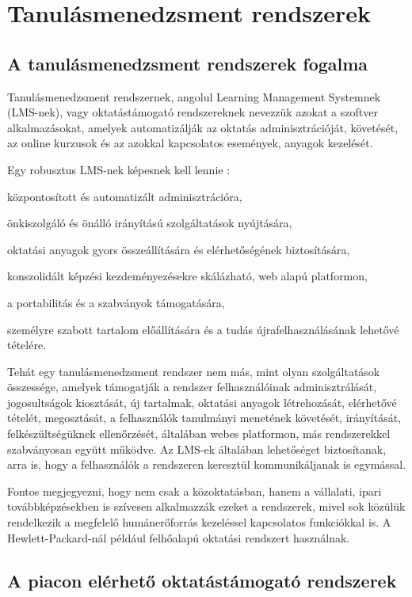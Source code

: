 \chapter{Tanulásmenedzsment rendszerek}
\section{A tanulásmenedzsment rendszerek fogalma}
Tanulásmenedzsment rendszernek, angolul Learning Management Systemnek (LMS-nek), vagy oktatástámogató rendszereknek nevezzük azokat a szoftver alkalmazásokat, amelyek automatizálják az oktatás adminisztrációját, követését, az online kurzusok és az azokkal kapcsolatos események, anyagok kezelését.

Egy robusztus LMS-nek képesnek kell lennie \cite{ellis2009}:
\begin{sajat_itemize}
\item központosított és automatizált adminisztrációra,
\item önkiszolgáló és önálló irányítású szolgáltatások nyújtására,
\item oktatási anyagok gyors összeállítására és elérhetőségének biztosítására,
\item konszolidált képzési kezdeményezésekre skálázható, web alapú platformon,
\item a portabilitás és a szabványok támogatására,
\item személyre szabott tartalom előállítására és a tudás újrafelhasználásának lehetővé tételére.
\end{sajat_itemize}

Tehát egy tanulásmenedzsment rendszer nem más, mint olyan szolgáltatások összessége, amelyek támogatják a rendszer felhasználóinak adminisztrálását, jogosultságok kiosztását, új tartalmak, oktatási anyagok létrehozását, elérhetővé tételét, megosztását, a felhasználók tanulmányi menetének követését, irányítását, felkészültségüknek ellenőrzését, általában webes platformon, más rendszerekkel szabványosan együtt működve. Az LMS-ek általában lehetőséget biztosítanak, arra is, hogy a felhasználók a rendszeren keresztül kommunikáljanak is egymással.

Fontos megjegyezni, hogy nem csak a közoktatásban, hanem a vállalati, ipari továbbképzésekben is szívesen alkalmazzák ezeket a rendszerek, mivel sok közülük rendelkezik a megfelelő humánerőforrás kezeléssel kapcsolatos funkciókkal is. A Hewlett-Packard-nál például felhőalapú oktatási rendszert használnak.

\section{A piacon elérhető oktatástámogató rendszerek}

